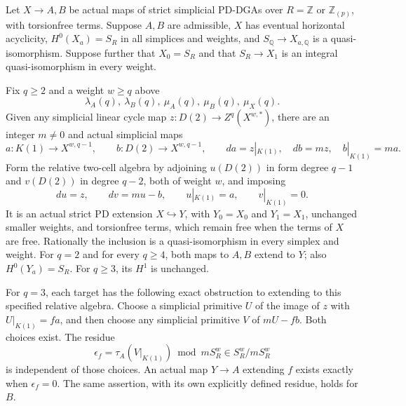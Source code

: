 \begin{theorem}
\label{AT15}
Let $X\to A,B$ be actual maps of strict simplicial
PD-DGAs over $R=\mathbb Z$ or $\mathbb Z_{(p)}$,
with torsionfree terms. Suppose $A,B$ are admissible,
$X$ has eventual horizontal acyclicity,
$H^0(X_a)=S_R$ in all simplices and weights, and
$S_{\mathbb Q}\to X_{a,\mathbb Q}$ is a quasi-isomorphism.
Suppose further that $X_0=S_R$ and that
$S_R\to X_1$ is an integral quasi-isomorphism
in every weight.

Fix $q\geq2$ and a weight $w\geq q$ above
\[
 \lambda_A(q),\ \lambda_B(q),\
 \mu_A(q),\ \mu_B(q),\ \mu_X(q).
 \tag{AT.62}
\]
Given any simplicial linear cycle map
$z:D(2)\to Z^q(X^{w,*})$, there are an integer
$m\ne0$ and actual simplicial maps
\[
 a:K(1)\to X^{w,q-1},\qquad
 b:D(2)\to X^{w,q-1},\qquad
 da=z|_{K(1)},\quad db=mz,\quad b|_{K(1)}=ma.
 \tag{AT.63}
\]
Form the relative two-cell algebra by adjoining
$u(D(2))$ in form degree $q-1$ and $v(D(2))$
in degree $q-2$, both of weight $w$, and imposing
\[
 du=z,\qquad dv=mu-b,\qquad
 u|_{K(1)}=a,\qquad v|_{K(1)}=0.
 \tag{AT.64}
\]
It is an actual strict PD extension $X\hookrightarrow Y$,
with $Y_0=X_0$ and $Y_1=X_1$, unchanged smaller weights,
and torsionfree terms, which remain free when the terms
of $X$ are free. Rationally the inclusion is a
quasi-isomorphism in every simplex and weight.
For $q=2$ and for every $q\geq4$, both maps to $A,B$
extend to $Y$; also $H^0(Y_a)=S_R$.
For $q\geq3$, its $H^1$ is unchanged.

For $q=3$, each target has the following exact obstruction
to extending to this specified relative algebra.
Choose a simplicial primitive $U$ of the image of $z$
with $U|_{K(1)}=fa$, and then choose any simplicial
primitive $V$ of $mU-fb$. Both choices exist.
The residue
\[
          \epsilon_f=\tau_A(V|_{K(1)})\bmod mS_R^w
                       \in S_R^w/mS_R^w
 \tag{AT.65}
\]
is independent of those choices. An actual map
$Y\to A$ extending $f$ exists exactly when
$\epsilon_f=0$. The same assertion, with its own
explicitly defined residue, holds for $B$.
\end{theorem}

